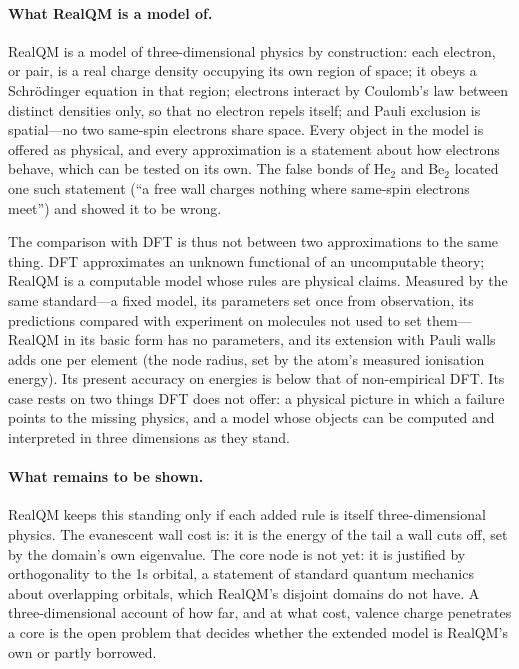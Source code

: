 \paragraph{What RealQM is a model of.}
RealQM is a model of three-dimensional physics by construction: each electron, or pair, is a real
charge density occupying its own region of space; it obeys a Schr\"odinger equation in that region;
electrons interact by Coulomb's law between distinct densities only, so that no electron repels
itself; and Pauli exclusion is spatial---no two same-spin electrons share space. Every object in the
model is offered as physical, and every approximation is a statement about how electrons behave, which
can be tested on its own. The false bonds of He$_2$ and Be$_2$ located one such statement (``a free wall
charges nothing where same-spin electrons meet'') and showed it to be wrong.

The comparison with DFT is thus not between two approximations to the same thing. DFT approximates an
unknown functional of an uncomputable theory; RealQM is a computable model whose rules are physical
claims. Measured by the same standard---a fixed model, its parameters set once from observation, its
predictions compared with experiment on molecules not used to set them---RealQM in its basic form has
no parameters, and its extension with Pauli walls adds one per element (the node radius, set by the
atom's measured ionisation energy). Its present accuracy on energies is below that of non-empirical
DFT. Its case rests on two things DFT does not offer: a physical picture in which a failure points to
the missing physics, and a model whose objects can be computed and interpreted in three dimensions as
they stand.

\paragraph{What remains to be shown.}
RealQM keeps this standing only if each added rule is itself three-dimensional physics. The
evanescent wall cost is: it is the energy of the tail a wall cuts off, set by the domain's own
eigenvalue. The core node is not yet: it is justified by orthogonality to the 1s orbital, a statement
of standard quantum mechanics about overlapping orbitals, which RealQM's disjoint domains do not have.
A three-dimensional account of how far, and at what cost, valence charge penetrates a core is the open
problem that decides whether the extended model is RealQM's own or partly borrowed.

